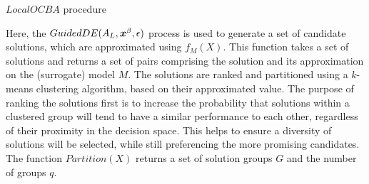 \begin{algorithm}[h!] 
\caption{$LocalOCBA$ procedure}
\label{alg:local-ocba}
{\footnotesize
\begin{algorithmic}[1]
 
 
 
 
\label{while-loop}
   
   
   
   
   
\ENDWHILE
{} 
\end{algorithmic}
}
\end{algorithm}

Here, the $GuidedDE(A_L,\boldsymbol{x}^\beta,\epsilon)$ process is used to generate a set of candidate solutions, which are approximated using $f_M(X)$. This function takes a set of solutions and returns a set of pairs comprising the solution and its approximation on the (surrogate) model $M$. The solutions are ranked and partitioned using a $k$-means clustering algorithm, based on their approximated value. The purpose of ranking the solutions first is to increase the probability that solutions within a clustered group will tend to have a similar performance to each other, regardless of their proximity in the decision space. This helps to ensure a diversity of solutions will be selected, while still preferencing the more promising candidates. The function $Partition(X)$ returns a set of solution groups $G$ and the number of groups $q$.

